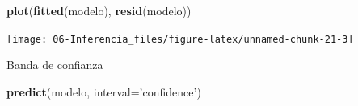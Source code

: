 \documentclass[]{book}
\newenvironment{Shaded}{\begin{snugshade}}{\end{snugshade}}
\newcommand{\KeywordTok}[1]{\textcolor[rgb]{0.13,0.29,0.53}{\textbf{#1}}}
\newcommand{\DataTypeTok}[1]{\textcolor[rgb]{0.13,0.29,0.53}{#1}}
\newcommand{\StringTok}[1]{\textcolor[rgb]{0.31,0.60,0.02}{#1}}
\newcommand{\NormalTok}[1]{#1}
\begin{document}
\begin{Shaded}
\begin{Highlighting}[]
\KeywordTok{plot}\NormalTok{(}\KeywordTok{fitted}\NormalTok{(modelo), }\KeywordTok{resid}\NormalTok{(modelo))}
\end{Highlighting}
\end{Shaded}

\begin{center}\texttt{[image: 06-Inferencia\_files/figure-latex/unnamed-chunk-21-3]} \end{center}

Banda de confianza

\begin{Shaded}
\begin{Highlighting}[]
\KeywordTok{predict}\NormalTok{(modelo, }\DataTypeTok{interval=}\StringTok{'confidence'}\NormalTok{)}
\end{Highlighting}
\end{Shaded}
\end{document}
